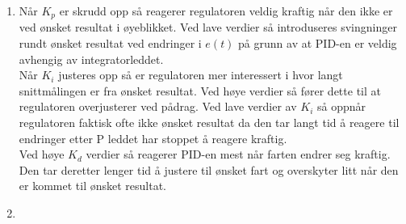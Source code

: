 \documentclass[answers,11pt]{exam}
\begin{document}
\begin{enumerate}[label=\alph*)]
\begin{tcolorbox}
\begin{enumerate}[label=q\arabic*)]
      \item
        Når $K_p$ er skrudd opp så reagerer regulatoren veldig kraftig når den ikke er ved ønsket 
        resultat i øyeblikket. Ved lave verdier så introduseres svingninger rundt ønsket resultat ved 
        endringer i $e(t)$ på grunn av at PID-en er veldig avhengig av integratorleddet. \\
        Når $K_i$ justeres opp så er regulatoren mer interessert i hvor langt snittmålingen er fra 
        ønsket resultat. Ved høye verdier så fører dette til at regulatoren overjusterer ved pådrag. 
        Ved lave verdier av $K_i$ så oppnår regulatoren faktisk ofte ikke ønsket resultat da den tar 
        langt tid å reagere til endringer etter P leddet har stoppet å reagere kraftig. \\
        Ved høye $K_d$ verdier så reagerer PID-en mest når farten endrer seg kraftig. Den tar deretter 
        lenger tid å justere til ønsket fart og overskyter litt når den er kommet til ønsket resultat.

      \item

    \end{enumerate}

  \end{tcolorbox}

  \newpage

\end{enumerate}
\end{document}
